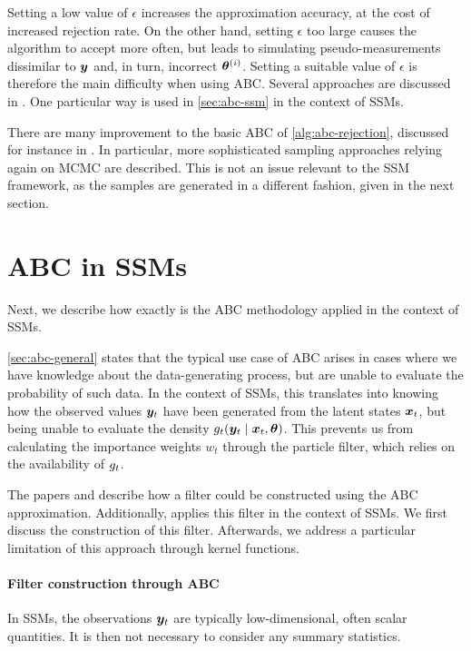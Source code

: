 Setting a low value of $\epsilon$ increases the approximation accuracy, at the cost of increased rejection rate. On the other hand, setting $\epsilon$ too large causes the algorithm to accept more often, but leads to simulating pseudo-measurements dissimilar to $\bm{y}$ and, in turn, incorrect $\bm{\theta}^{(i)}$. Setting a suitable value of $\epsilon$ is therefore the main difficulty when using ABC. Several approaches are discussed in \cite{jasra-filtering, jasra-time-series}. One particular way \citep{dedecius} is used in \autoref{sec:abc-ssm} in the context of SSMs.

There are many improvement to the basic ABC of \autoref{alg:abc-rejection}, discussed for instance in \cite{abc-recent}. In particular, more sophisticated sampling approaches relying again on MCMC are described. This is not an issue relevant to the SSM framework, as the samples are generated in a different fashion, given in the next section.

\section{ABC in SSMs} \label{sec:abc-ssm}
Next, we describe how exactly is the ABC methodology applied in the context of SSMs.

\autoref{sec:abc-general} states that the typical use case of ABC arises in cases where we have knowledge about the data-generating process, but are unable to evaluate the probability of such data. In the context of SSMs, this translates into knowing how the observed values $\bm{y}_t$ have been generated from the latent states $\bm{x}_t$, but being unable to evaluate the density $g_t(\bm{y}_t \mid \bm{x}_t, \bm{\theta})$. This prevents us from calculating the importance weights $w_t$ through the particle filter, which relies on the availability of $g_t$.

The papers \cite{tina-toni} and \cite{jasra-filtering} describe how a filter could be constructed using the ABC approximation. Additionally, \cite{jasra-time-series} applies this filter in the context of SSMs. We first discuss the construction of this filter. Afterwards, we address a particular limitation of this approach through kernel functions.

\paragraph{Filter construction through ABC}
In SSMs, the observations $\bm{y}_t$ are typically low-dimensional, often scalar quantities. It is then not necessary to consider any summary statistics.

